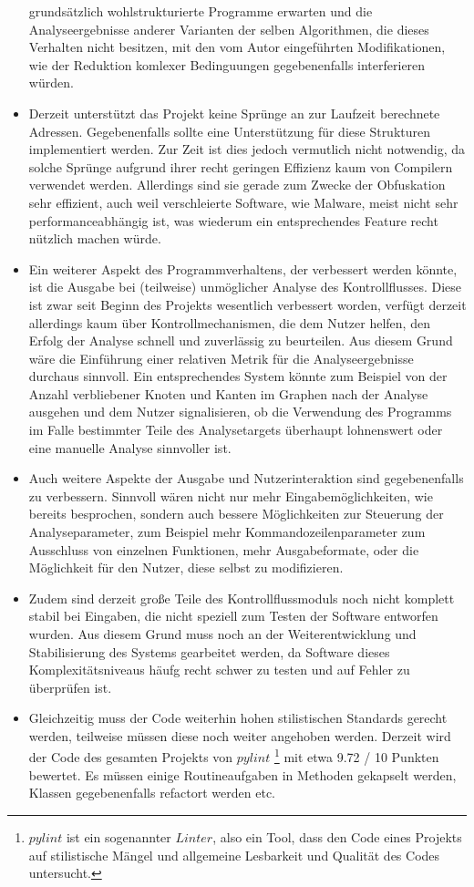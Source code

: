 \documentclass[11pt]{article}
\begin{document}
\begin{itemize}
{		grundsätzlich wohlstrukturierte Programme erwarten und die Analyseergebnisse anderer
		Varianten der selben Algorithmen, die dieses Verhalten nicht besitzen, mit den vom
		Autor eingeführten Modifikationen, wie der Reduktion komlexer Bedinguungen gegebenenfalls
		interferieren würden.
	}
	\item{Derzeit unterstützt das Projekt keine Sprünge an zur Laufzeit berechnete Adressen. Gegebenenfalls
		sollte eine Unterstützung für diese Strukturen implementiert werden. Zur Zeit ist dies
		jedoch vermutlich nicht notwendig, da solche Sprünge aufgrund ihrer recht geringen Effizienz
		kaum von Compilern verwendet werden. Allerdings sind sie gerade zum Zwecke der Obfuskation
		sehr effizient, auch weil verschleierte Software, wie Malware, meist nicht sehr
		performanceabhängig ist, was wiederum ein entsprechendes Feature recht nützlich machen würde.
	}
	\item{Ein weiterer Aspekt des Programmverhaltens, der verbessert werden könnte, ist die Ausgabe bei
		(teilweise) unmöglicher Analyse des Kontrollflusses. Diese ist zwar seit Beginn des Projekts
		wesentlich verbessert worden, verfügt derzeit allerdings kaum über Kontrollmechanismen, die dem
		Nutzer helfen, den Erfolg der Analyse schnell und zuverlässig zu beurteilen. Aus diesem Grund
		wäre die Einführung einer relativen Metrik für die Analyseergebnisse durchaus sinnvoll. Ein
		entsprechendes System könnte zum Beispiel von der Anzahl verbliebener Knoten und Kanten im
		Graphen nach der Analyse ausgehen und dem Nutzer signalisieren, ob die Verwendung des Programms
		im Falle bestimmter Teile des Analysetargets überhaupt lohnenswert oder eine manuelle Analyse
		sinnvoller ist.
	}
	\item{Auch weitere Aspekte der Ausgabe und Nutzerinteraktion sind gegebenenfalls zu verbessern. Sinnvoll
		wären nicht nur mehr Eingabemöglichkeiten, wie bereits besprochen, sondern auch bessere
		Möglichkeiten zur Steuerung der Analyseparameter, zum Beispiel mehr Kommandozeilenparameter
		zum Ausschluss von einzelnen Funktionen, mehr Ausgabeformate, oder die Möglichkeit für den Nutzer,
		diese selbst zu modifizieren.
	}
	\item{Zudem sind derzeit große Teile des Kontrollflussmoduls noch nicht komplett stabil bei Eingaben, die
		nicht speziell zum Testen der Software entworfen wurden. Aus diesem Grund muss noch an der
		Weiterentwicklung und Stabilisierung des Systems gearbeitet werden, da Software dieses
		Komplexitätsniveaus häufg recht schwer zu testen und auf Fehler zu überprüfen ist.
	}
	\item{Gleichzeitig muss der Code weiterhin hohen stilistischen Standards gerecht werden, teilweise müssen
		diese noch weiter angehoben werden. Derzeit wird der Code des gesamten Projekts von $pylint$
		\footnote{$pylint$ ist ein sogenannter $Linter$, also ein Tool, dass den Code eines Projekts auf
			stilistische Mängel und allgemeine Lesbarkeit und Qualität des Codes untersucht.
		}
		mit etwa 9.72 / 10 Punkten bewertet. Es müssen einige Routineaufgaben in Methoden
		gekapselt werden, Klassen gegebenenfalls refactort werden etc.
	}
\end{itemize}
\end{document}
